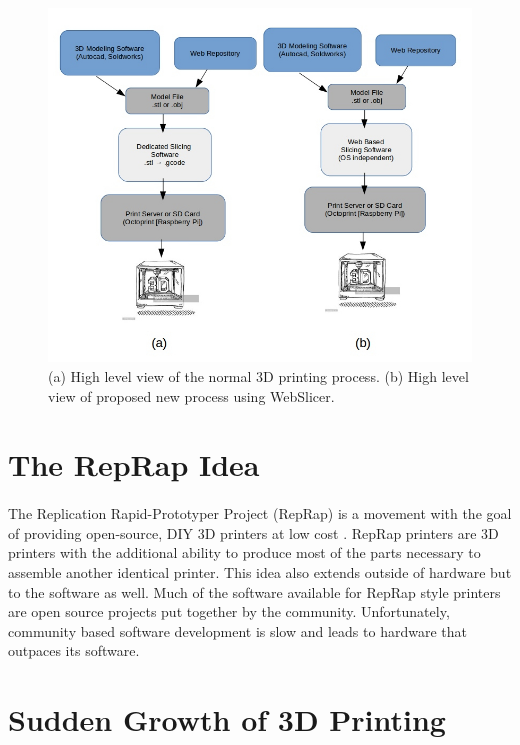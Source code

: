 \begin{figure}[!ht]
  \centering
  \includegraphics[width=\linewidth]{diagrams/basic-process-3D-printing}
  \caption{(a) High level view of the normal 3D printing process. (b) High level view of proposed new process using WebSlicer.}
\end{figure}


\section{The RepRap Idea}
\paragraph{}
The Replication Rapid-Prototyper Project (RepRap) is a movement with the goal of providing open-source, DIY 3D printers at low cost \citep{reprap-2011}.
RepRap printers are 3D printers with the additional ability to produce most of the parts necessary to assemble another identical printer.
This idea also extends outside of hardware but to the software as well.
Much of the software available for RepRap style printers are open source projects put together by the community.
Unfortunately, community based software development is slow and leads to hardware that outpaces its software.

\section{Sudden Growth of 3D Printing}
